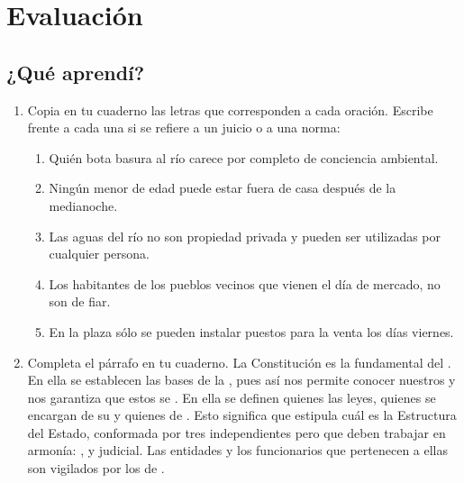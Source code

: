 \documentclass[10pt,twoside]{article}
\begin{document}
\section*{Evaluaci\'{o}n}
\subsection*{¿Qu\'{e} aprend\'{i}?}
\begin{enumerate}
\item Copia en tu cuaderno las letras que corresponden a cada
oración. Escribe frente a cada una si se refiere a un juicio o a una norma:
\begin{enumerate}
\item Quién bota basura al río carece por completo de conciencia ambiental.
\item Ningún menor de edad puede estar fuera de casa después
de la medianoche.
\item Las aguas del río no son propiedad privada y pueden ser
utilizadas por cualquier persona.
\item Los habitantes de los pueblos vecinos que vienen el día de mercado, no son de fiar.
\item En la plaza sólo se pueden instalar puestos para la venta los días viernes.
\end{enumerate}
\item Completa el párrafo en tu cuaderno.
La Constitución es la \underline{\hspace*{1cm}} fundamental del \underline{\hspace*{1.5cm}}. En ella se establecen las bases de la \underline{\hspace*{1.5cm}}, pues así nos permite conocer nuestros \underline{\hspace*{1.5cm}} y nos garantiza que estos se \underline{\hspace*{1.5cm}}. En ella se definen quienes \underline{\hspace*{1.5cm}} las leyes, quienes se encargan de su \underline{\hspace*{2cm}} y quienes de \underline{\hspace*{2cm}}. Esto significa que estipula cuál es la Estructura del Estado, conformada por tres \underline{\hspace*{1.5cm}} independientes pero que deben trabajar en armonía: \underline{\hspace*{2cm}}, \underline{\hspace*{2cm}} y judicial. Las entidades y los funcionarios que pertenecen a ellas son vigilados por los \underline{\hspace*{2cm}} de \underline{\hspace*{2cm}}.

\end{enumerate}
\end{document}
